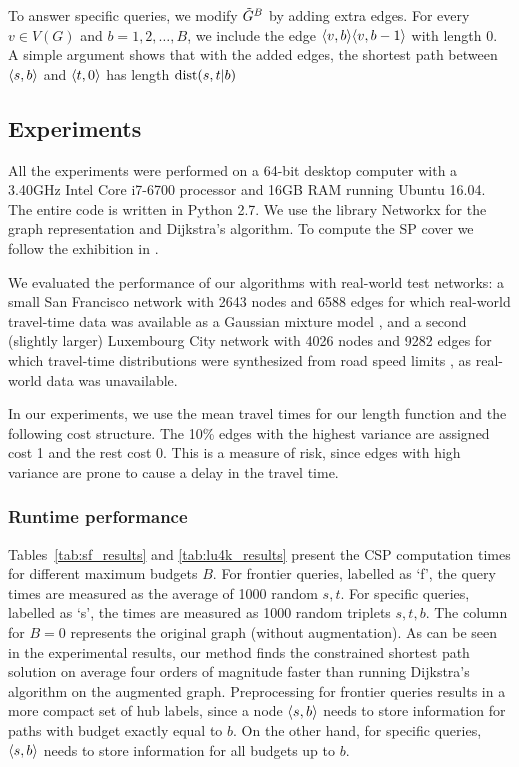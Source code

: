 To answer specific queries, we modify $\tilde G^B$ by adding extra edges.
For every $v\in V(G)$ and $b=1,2,\ldots,B$, we include the edge $\langle v,b\rangle\langle v,b-1\rangle$ with length $0$.
A simple argument shows that with the added edges, the shortest path between $\langle s,b\rangle$ and $\langle t,0\rangle$ has length $\text{dist}(s,t|b)$

\subsection{Experiments} \label{sec:exp}
All the experiments were performed on a 64-bit desktop computer with a 3.40GHz Intel Core i7-6700 processor and 16GB RAM running Ubuntu 16.04.
The entire code is written in Python 2.7. We use the library Networkx for the graph representation and Dijkstra's algorithm.
To compute the SP cover we follow the exhibition in \cite{hubimplem}.

We evaluated the performance of our algorithms with real-world test networks: a small San Francisco network with 2643 nodes and 6588 edges for which real-world travel-time data was available as a Gaussian mixture model \cite{sf_data}, and a second (slightly larger) Luxembourg City network with 4026 nodes and 9282 edges for which travel-time distributions were synthesized from road speed limits \cite{niknami2016tractable}, as real-world data was unavailable.
 
In our experiments, we use the mean travel times for our length function and the following cost structure. The 10\% edges with the highest variance are assigned cost 1 and the rest cost 0.
This is a measure of risk, since edges with high variance are prone to cause a delay in the travel time.

\subsubsection{Runtime performance}


Tables~\ref{tab:sf_results} and \ref{tab:lu4k_results} present the CSP computation times for different maximum budgets $B$. 
For frontier queries, labelled as `f', the query times are measured as the average of 1000 random $s,t$.
For specific queries, labelled as `s', the times are measured as 1000 random triplets $s,t,b$.
The column for $B=0$ represents the original graph (without augmentation). 
As can be seen in the experimental results, our method finds the constrained shortest path solution on average four orders of magnitude faster than running Dijkstra's algorithm on the augmented graph. 
Preprocessing for frontier queries results in a more compact set of hub labels, since a node $\langle s,b\rangle$ needs to store information for paths with budget exactly equal to $b$.
On the other hand, for specific queries, $\langle s,b\rangle$ needs to store information for all budgets up to $b$.

